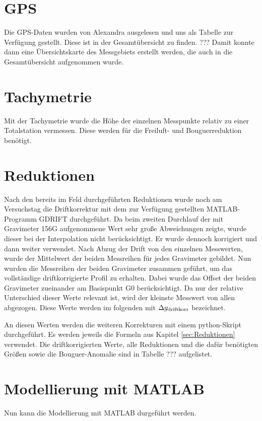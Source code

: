 
\section{GPS}

Die GPS-Daten wurden von Alexandra ausgelesen und uns als Tabelle zur Verfügung gestellt. Diese ist in der Gesamtübersicht zu finden. ??? Damit konnte dann eine Übersichtskarte des Messgebiets erstellt werden, die auch in die Gesamtübersicht aufgenommen wurde.

\section{Tachymetrie}

Mit der Tachymetrie wurde die Höhe der einzelnen Messpunkte relativ zu einer Totalstation vermessen. Diese werden für die Freiluft- und Bouguerreduktion benötigt.

\section{Reduktionen}

Nach den bereits im Feld durchgeführten Reduktionen wurde noch am Versuchstag die Driftkorrektur mit dem zur Verfügung gestellten MATLAB-Programm GDRIFT durchgeführt. Da beim zweiten Durchlauf der mit Gravimeter 156G aufgenommene Wert sehr große Abweichungen zeigte, wurde dieser bei der Interpolation nicht berücksichtigt. Er wurde dennoch korrigiert und dann weiter verwendet. Nach Abzug der Drift von den einzelnen Messwerten, wurde der Mittelwert der beiden Messreihen für jedes Gravimeter gebildet. Nun wurden die Messreihen der beiden Gravimeter zusammen geführt, um das vollständige driftkorrigierte Profil zu erhalten. Dabei wurde das Offset der beiden Gravimeter zueinander am Basispunkt G0 berücksichtigt. Da nur der relative Unterschied dieser Werte relevant ist, wird der kleinste Messwert von allen abgezogen. Diese Werte werden im folgenden mit $\Delta g_{\mathrm{driftkorr}}$ bezeichnet.

An diesen Werten werden die weiteren Korrekturen mit einem python-Skript durchgeführt. Es werden jeweils die Formeln aus Kapitel \ref{sec:Reduktionen} verwendet. Die driftkorrigierten Werte, alle Reduktionen und die dafür benötigten Größen sowie die Bouguer-Anomalie sind in Tabelle ??? aufgelistet.


\section{Modellierung mit MATLAB}

Nun kann die Modellierung mit MATLAB durgeführt werden.